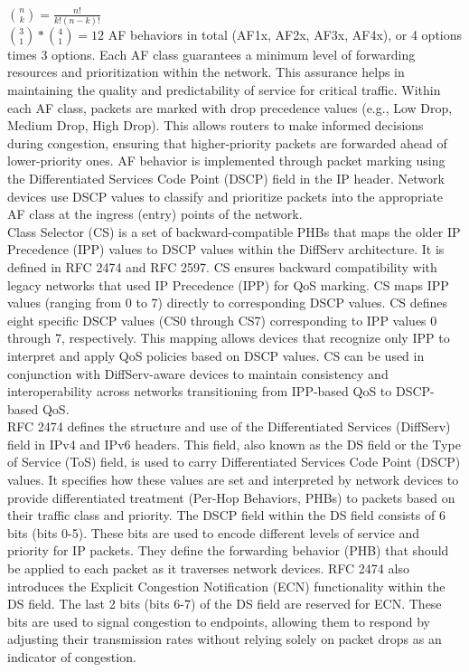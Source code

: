 \documentclass{article}
\begin{document}
	$\binom{n}{k} = \frac{n!}{k!(n-k)!}$\\
	
	$\binom{3}{1} * \binom{4}{1} = 12$ AF behaviors in total (AF1x, AF2x, AF3x, AF4x), or 4 options times 3 options. Each AF class guarantees a minimum level of forwarding resources and prioritization within the network. This assurance helps in maintaining the quality and predictability of service for critical traffic. Within each AF class, packets are marked with drop precedence values (e.g., Low Drop, Medium Drop, High Drop). This allows routers to make informed decisions during congestion, ensuring that higher-priority packets are forwarded ahead of lower-priority ones. AF behavior is implemented through packet marking using the Differentiated Services Code Point (DSCP) field in the IP header. Network devices use DSCP values to classify and prioritize packets into the appropriate AF class at the ingress (entry) points of the network.\\
	
	Class Selector (CS) is a set of backward-compatible PHBs that maps the older IP Precedence (IPP) values to DSCP values within the DiffServ architecture. It is defined in RFC 2474 and RFC 2597. CS ensures backward compatibility with legacy networks that used IP Precedence (IPP) for QoS marking. CS maps IPP values (ranging from 0 to 7) directly to corresponding DSCP values. CS defines eight specific DSCP values (CS0 through CS7) corresponding to IPP values 0 through 7, respectively. This mapping allows devices that recognize only IPP to interpret and apply QoS policies based on DSCP values. CS can be used in conjunction with DiffServ-aware devices to maintain consistency and interoperability across networks transitioning from IPP-based QoS to DSCP-based QoS.\\
	
	RFC 2474 defines the structure and use of the Differentiated Services (DiffServ) field in IPv4 and IPv6 headers. This field, also known as the DS field or the Type of Service (ToS) field, is used to carry Differentiated Services Code Point (DSCP) values. It specifies how these values are set and interpreted by network devices to provide differentiated treatment (Per-Hop Behaviors, PHBs) to packets based on their traffic class and priority. The DSCP field within the DS field consists of 6 bits (bits 0-5). These bits are used to encode different levels of service and priority for IP packets. They define the forwarding behavior (PHB) that should be applied to each packet as it traverses network devices. RFC 2474 also introduces the Explicit Congestion Notification (ECN) functionality within the DS field. The last 2 bits (bits 6-7) of the DS field are reserved for ECN. These bits are used to signal congestion to endpoints, allowing them to respond by adjusting their transmission rates without relying solely on packet drops as an indicator of congestion.\\
	
\end{document}
